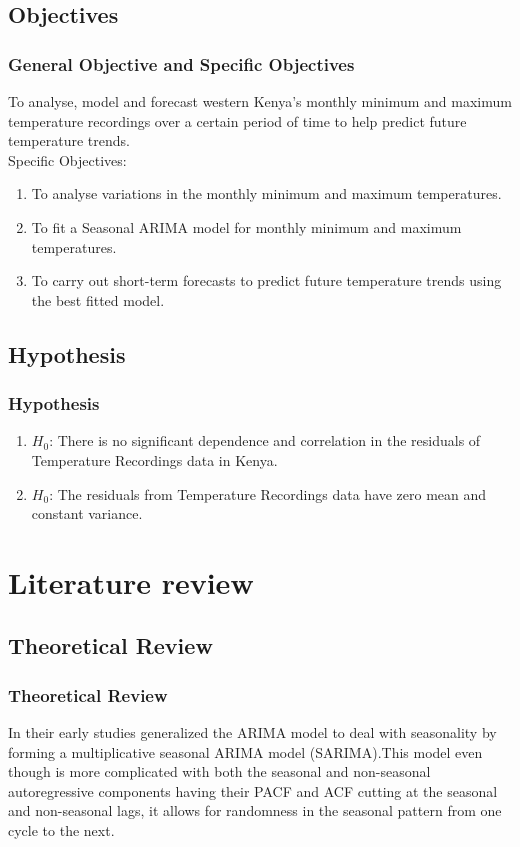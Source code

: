 \documentclass[]{beamer}
\begin{document}
\subsection{Objectives}
\begin{frame}
\frametitle{General Objective and Specific Objectives} 
To analyse, model and forecast western Kenya's monthly minimum and maximum temperature recordings over a certain period of time to help predict future temperature trends.\\
Specific Objectives:\\
\begin{enumerate}
	\item To analyse variations in the monthly minimum and maximum temperatures. 
	\item To fit a Seasonal ARIMA model for monthly minimum and maximum temperatures.
	\item To carry out short-term forecasts to predict future temperature trends using the best fitted model.
\end{enumerate}
\end{frame}
\subsection{Hypothesis}
\begin{frame}
	\frametitle{Hypothesis}
	\begin{enumerate}
		\item $ H_{0} $: There is no significant dependence and correlation in the residuals of Temperature Recordings data in Kenya.
		\item $ H_{0}$: The residuals from Temperature Recordings data  have zero mean and constant variance.
	\end{enumerate}
\end{frame}
\section{Literature review}

\subsection{Theoretical Review}
\begin{frame}
\frametitle{Theoretical Review}
In their early studies \cite{02} generalized the ARIMA model to deal with seasonality by forming a multiplicative seasonal ARIMA model (SARIMA).This model even though is more complicated with both the seasonal and non-seasonal autoregressive components having their PACF and ACF cutting at the seasonal and non-seasonal lags, it allows for randomness in the seasonal pattern from one cycle to the next.
\end{frame}
\end{document}
